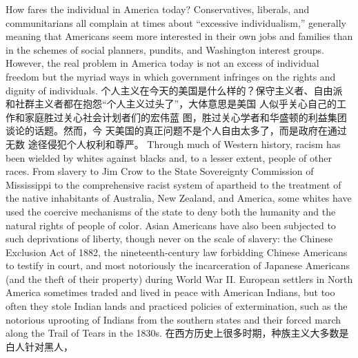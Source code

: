 \begin{paracol}{2}
How fares the individual in America today? Conservatives, liberals, and communitarians all complain at times about ``excessive individualism,'' generally meaning that Americans seem
more interested in their own jobs and families than in the
schemes of social planners, pundits, and Washington interest
groups. However, the real problem in America today is not an
excess of individual freedom but the myriad ways in which government infringes on the rights and dignity of individuals.
\switchcolumn
个人主义在今天的美国是什么样的？保守主义者、自由派
和社群主义者都在抱怨“个人主义过头了”，大体意思是美国
人似乎关心自己的工作和家庭胜过关心社会计划者们的宏伟蓝
图，胜过关心学者和华盛顿的利益集团谈论的话题。然而，今
天美国的真正问题不是个人自由太多了，而是政府在通过无数
途径侵犯个人权利和尊严。
\switchcolumn*
Through much of Western history, racism has been wielded
by whites against blacks and, to a lesser extent, people of other
races. From slavery to Jim Crow to the State Sovereignty Commission of Mississippi to the comprehensive racist system of
apartheid to the treatment of the native inhabitants of Australia, New Zealand, and America, some whites have used the
coercive mechanisms of the state to deny both the humanity
and the natural rights of people of color. Asian Americans have
also been subjected to such deprivations of liberty, though never
on the scale of slavery: the Chinese Exclusion Act of 1882, the
nineteenth-century law forbidding Chinese Americans to testify
in court, and most notoriously the incarceration of Japanese
Americans (and the theft of their property) during World War
II. European settlers in North America sometimes traded and
lived in peace with American Indians, but too often they stole
Indian lands and practiced policies of extermination, such as the
notorious uprooting of Indians from the southern states and
their forced march along the Trail of Tears in the 1830s.
\switchcolumn
在西方历史上很多时期，种族主义大多数是白人针对黑人，

\end{paracol}
